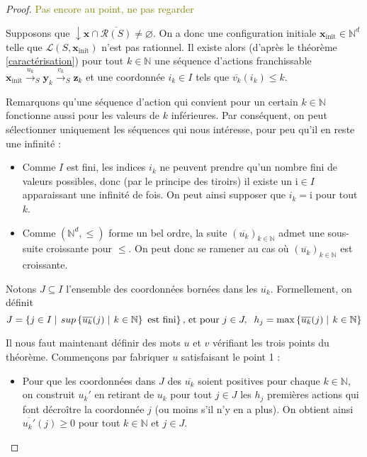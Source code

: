 \documentclass[a4paper,final]{article}
\theoremstyle{definition}
\let\leq\leqslant
\let\geq\geqslant
\newcommand{\alain}[1]{\textcolor{blue}{#1}}
\newcommand{\lucas}[1]{\textcolor{olive}{#1}}
\newcommand{\set}[2]{\left\{#1\mathrel{\left|\vphantom{#1}\vphantom{#2}\right.}#2\right\}}
\let\inter\cap
\let\vide\varnothing
\newcommand{\N}{\ensuremath{\mathbb{N}}}
\newcommand{\lang}{\ensuremath{\mathcal{L}}}
\newcommand{\trans}[2]{\ensuremath{\stackrel{#1}{\longrightarrow}_{#2}}}
\newcommand{\vect}[1]{\ensuremath{\mathbf{#1}}}
\newcommand{\xinit}{\ensuremath{\vect{x}_\text{init}}}
\newcommand{\valeur}[1]{\ensuremath{\overline{#1}}}
\newcommand{\inirat}{\mathcal{R}}
\begin{document}

\begin{proof}
\lucas{Pas encore au point, ne pas regarder}

Supposons que $\downarrow \vect{x} \inter \overline{\inirat(S)} \neq \vide$.
On a donc une configuration initiale $\xinit \in \N^d$ telle que $\lang(S,\xinit)$ n'est pas rationnel.
Il existe alors (d'après le théorème \ref{caractérisation}) pour tout $k\in\N$ une séquence d'actions franchissable 
$\xinit \trans{u_k}{S} \vect{y}_k \trans{v_k}{S} \vect{z}_k$
et une coordonnée $i_k \in I$ tels que $\valeur{v_k}(i_k) \leq k$.

Remarquons qu'une séquence d'action qui convient pour un certain $k\in\N$ fonctionne aussi pour les valeurs de $k$ inférieures.
Par conséquent, on peut sélectionner uniquement les séquences qui nous intéresse, pour peu qu'il  en reste une infinité :

\begin{itemize}
    \item Comme $I$ est fini, les indices $i_k$ ne peuvent prendre qu'un nombre fini de valeurs possibles, donc (par le principe des tiroirs) il existe un $\mathrm{i}\in I$ apparaissant une infinité de fois.
    On peut ainsi supposer que $i_k = \mathrm{i}$ pour tout $k$.
    
    \item Comme $(\N^d,\leq)$ forme un bel ordre, la suite $(\valeur{u_k})_{k\in\N}$ admet une sous-suite croissante pour $\leq$.
    On peut donc se ramener au cas où $(\valeur{u_k})_{k\in\N}$ est croissante.
\end{itemize}

Notons $J\subseteq I$ l'ensemble des coordonnées bornées dans les $\valeur{u_k}$.
Formellement, on définit 
$$J = \set{j\in I}{sup \set{\valeur{u_k}(j)}{k\in\N} \text{ est fini}}
\text{, et pour } j\in J,\hspace{2mm} h_j = \max \set{\valeur{u_k}(j)}{k\in\N}$$

Il nous faut maintenant définir des mots $u$ et $v$ vérifiant les trois points du théorème.
Commençons par fabriquer $u$ satisfaisant le point 1 :
\begin{itemize}
    \item Pour que les coordonnées dans $J$ des $\valeur{u_k}$ soient positives pour chaque $k\in\N$, 
    on construit $u_k'$ en retirant de $u_k$ pour tout $j\in J$ les $h_j$ premières actions qui font décroître la coordonnée $j$ (ou moins s'il n'y en a plus).
    On obtient ainsi $\valeur{u_k'}(j) \geq 0$ pour tout $k\in\N$ et $j\in J$.
    

\end{itemize}
\end{proof}
\end{document}
